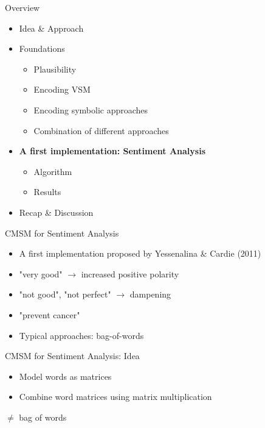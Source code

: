 \documentclass[12pt,a4paper]{beamer}
\begin{document}
\begin{frame}{Overview}
\begin{itemize}
\item Idea \& Approach %
\item Foundations
\begin{itemize}
    \item Plausibility %
    \item Encoding VSM %
    \item Encoding symbolic approaches
    \item Combination of different approaches
\end{itemize}
\item \textbf{A first implementation: Sentiment Analysis}
\begin{itemize}
    \item Algorithm %
    \item Results %
\end{itemize}
\item Recap \& Discussion
\end{itemize}
\end{frame}



\begin{frame}{CMSM for Sentiment Analysis}
\begin{itemize}
\item A first implementation proposed by Yessenalina \&  Cardie (2011)
\item "very good" $\to$ increased positive polarity
\item "not good", "not perfect" $\to$ dampening
\item "prevent cancer"
\item Typical approaches: bag-of-words
\end{itemize}
\end{frame}


\begin{frame}{CMSM for Sentiment Analysis: Idea}
\begin{itemize}
\item Model words as matrices
\item Combine word matrices using matrix multiplication
\end{itemize}
$\ne$ bag of words
\end{frame}
\end{document}
